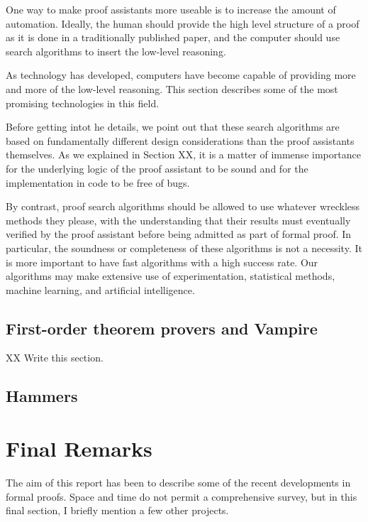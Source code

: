 \documentclass[brochure,english,12pt]{bourbaki}
\theoremstyle{plain}
\begin{document}
One way to make proof assistants more useable is to increase the amount of
automation.   Ideally, the human should provide the high level structure of a proof
as it is done in a traditionally published paper, and the computer should use
search algorithms to insert the low-level reasoning.   

As technology has developed, computers have become capable of providing
more and more of the low-level reasoning.   This section describes some of
the most promising technologies in this field.

Before getting intot he details, we point out that these search algorithms
are based on fundamentally different design considerations than the proof
assistants themselves.  As we explained in Section XX, it is a matter of
immense importance for the underlying logic of the proof assistant to be sound
and for the implementation in code to be free of bugs.  

By contrast, proof search algorithms should be allowed to use whatever
wreckless methods they please, with the understanding that their results must
eventually verified by  the proof assistant before being admitted as part of
formal proof.  In particular, the soundness or completeness of these algorithms
is not a necessity.  It is more important to have fast algorithms with a high
success rate.  Our algorithms may make extensive use of
experimentation, statistical methods, machine learning, and artificial intelligence.



\subsection{First-order theorem provers and Vampire}


XX Write this section.

\subsection{Hammers}





\section{Final Remarks}

The aim of this report has been to describe some of the recent developments in formal proofs.
Space and time do not permit a comprehensive survey, but in this final section, I briefly mention
a few other projects.
\end{document}
